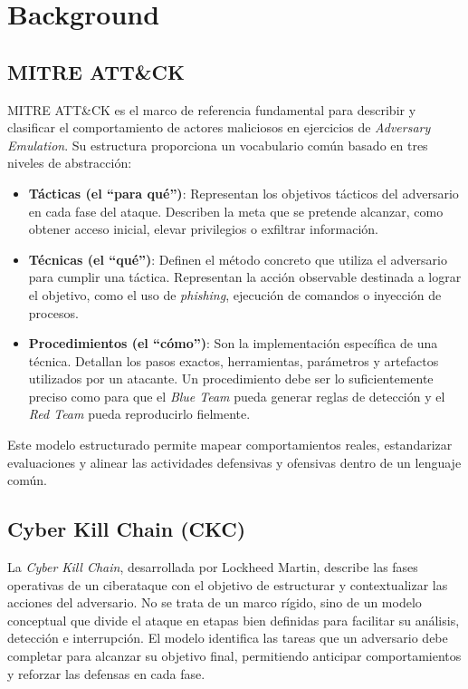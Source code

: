 

\chapter{Background}
\label{chap:background}

\section{MITRE ATT\&CK}

MITRE ATT\&CK es el marco de referencia fundamental para describir y clasificar el comportamiento de actores maliciosos en ejercicios de \textit{Adversary Emulation}. Su estructura proporciona un vocabulario común basado en tres niveles de abstracción:

\begin{itemize}
    \item \textbf{Tácticas (el ``para qué'')}: Representan los objetivos tácticos del adversario en cada fase del ataque. Describen la meta que se pretende alcanzar, como obtener acceso inicial, elevar privilegios o exfiltrar información.

    \item \textbf{Técnicas (el ``qué'')}: Definen el método concreto que utiliza el adversario para cumplir una táctica. Representan la acción observable destinada a lograr el objetivo, como el uso de \textit{phishing}, ejecución de comandos o inyección de procesos.

    \item \textbf{Procedimientos (el ``cómo'')}: Son la implementación específica de una técnica. Detallan los pasos exactos, herramientas, parámetros y artefactos utilizados por un atacante. Un procedimiento debe ser lo suficientemente preciso como para que el \textit{Blue Team} pueda generar reglas de detección y el \textit{Red Team} pueda reproducirlo fielmente.
\end{itemize}

Este modelo estructurado permite mapear comportamientos reales, estandarizar evaluaciones y alinear las actividades defensivas y ofensivas dentro de un lenguaje común.

\section{Cyber Kill Chain (CKC)}

La \textit{Cyber Kill Chain}, desarrollada por Lockheed Martin, describe las fases operativas de un ciberataque con el objetivo de estructurar y contextualizar las acciones del adversario. No se trata de un marco rígido, sino de un modelo conceptual que divide el ataque en etapas bien definidas para facilitar su análisis, detección e interrupción. El modelo identifica las tareas que un adversario debe completar para alcanzar su objetivo final, permitiendo anticipar comportamientos y reforzar las defensas en cada fase.

